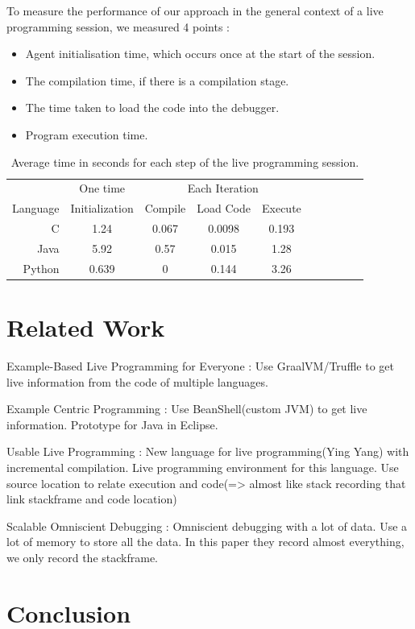 \documentclass[english,submission]{programming}
\begin{document}
To measure the performance of our approach in the general context of a live programming session, we measured 4 points : 

\begin{itemize}
  \item Agent initialisation time, which occurs once at the start of the session.
  \item The compilation time, if there is a compilation stage.
  \item The time taken to load the code into the debugger.
  \item  Program execution time.
\end{itemize}


\begin{table}[h]
  \centering
  \begin{tabular}{@{} r c c c c c c c c c @{}}
  \toprule
  & \multicolumn{1}{c}{One time} & \multicolumn{3}{c}{Each Iteration} \\
  
  Language & Initialization & Compile & Load Code & Execute \\ \midrule
  C & 1.24 & 0.067 & 0.0098 & 0.193 \\
  Java & 5.92 & 0.57 & 0.015 & 1.28 \\
  Python & 0.639 & 0 & 0.144 & 3.26 \\
  \bottomrule
  \end{tabular}
  \caption{Average time in seconds for each step of the live programming session.}
  \label{table:average-time}
\end{table}

\section{Related Work}
\label{sec:related-work}

Example-Based Live Programming for Everyone\cite{10.1145/3426428.3426919} : Use GraalVM/Truffle to get live information from the code of multiple languages.

Example Centric Programming\cite{10.1145/1052883.1052894} : Use BeanShell(custom JVM) to get live information. Prototype for Java in Eclipse.

Usable Live Programming\cite{10.1145/2509578.2509585} : New language for live programming(Ying Yang) with incremental compilation. Live programming environment for this language.
Use source location to relate execution and code(=> almost like stack recording that link stackframe and code location)

Scalable Omniscient Debugging\cite{10.1145/1297105.1297067} : Omniscient debugging with a lot of data. Use a lot of memory to store all the data.
In this paper they record almost everything, we only record the stackframe.

\section{Conclusion}
\label{sec:conclusion}

\printbibliography
\end{document}
